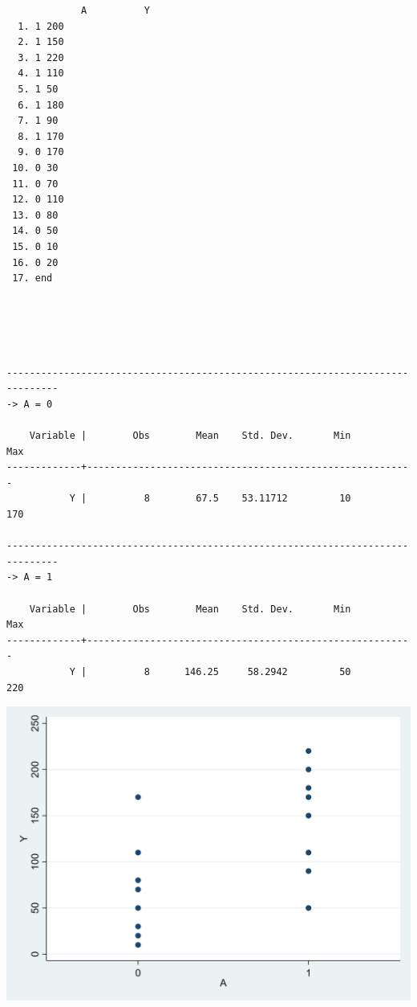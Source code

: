 \documentclass[
  10pt,
]{book}
\begin{document}
\begin{verbatim}
             A          Y
  1. 1 200
  2. 1 150
  3. 1 220
  4. 1 110
  5. 1 50
  6. 1 180
  7. 1 90
  8. 1 170
  9. 0 170
 10. 0 30
 11. 0 70
 12. 0 110
 13. 0 80
 14. 0 50
 15. 0 10
 16. 0 20
 17. end





-------------------------------------------------------------------------------
-> A = 0

    Variable |        Obs        Mean    Std. Dev.       Min        Max
-------------+---------------------------------------------------------
           Y |          8        67.5    53.11712         10        170

-------------------------------------------------------------------------------
-> A = 1

    Variable |        Obs        Mean    Std. Dev.       Min        Max
-------------+---------------------------------------------------------
           Y |          8      146.25     58.2942         50        220
\end{verbatim}

\begin{center}\includegraphics[width=0.85\linewidth]{figs/stata-fig-11-1} \end{center}
\end{document}
